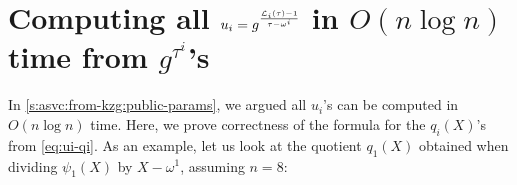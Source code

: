 \section{Computing all $u_i=g^\frac{\mathcal{L}_i(\tau) - 1}{\tau - \omega^i}$ in $O(n\log{n})$ time from $g^{\tau^i}$'s}
\label{s:computing-all-uis}

In \cref{s:asvc:from-kzg:public-params}, we argued all $u_i$'s can be computed in $O(n\log{n})$ time.
Here, we prove correctness of the formula for the $q_i(X)$'s from \cref{eq:ui-qi}.
As an example, let us look at the quotient $q_1(X)$ obtained when dividing $\psi_1(X)$ by $X-\omega^1$, assuming $n=8$:
\\


